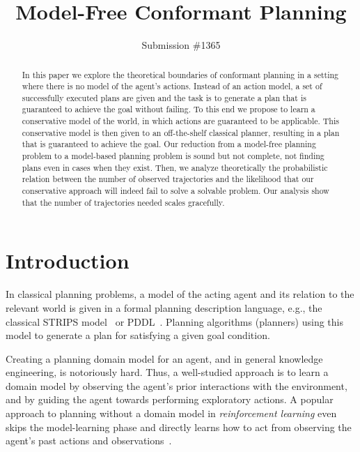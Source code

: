 \documentclass{article}
\title{Model-Free Conformant Planning}
\author{Submission \#1365}
\newcommand{\roni}[1]{[[Roni:#1]]}
\begin{document}
	
	\maketitle
	
	\begin{abstract}
		In this paper we explore the theoretical boundaries of 
		conformant planning in a setting where 
		there is no model of the agent's actions. 
		Instead of an action model, a set of successfully executed plans are given and the task is to generate a plan that is guaranteed to achieve the goal without failing. 
		To this end we propose to learn a conservative model of the world, in which actions are guaranteed to be applicable. This conservative model is then given to an off-the-shelf classical planner, resulting in a plan that is guaranteed to achieve the goal. 
		Our reduction from a model-free planning problem to a model-based planning problem is sound but not complete, not finding plans even in cases when they exist. 
		Then, we analyze theoretically the probabilistic relation between the number of observed trajectories and the likelihood that our conservative approach will indeed fail to solve a solvable problem. Our analysis show that the number of trajectories needed scales gracefully.
	\end{abstract}
	
	\section{Introduction}
	In classical planning problems, a model of the acting agent and its relation to the relevant world is given in a formal planning description language, e.g., the classical STRIPS model~\cite{fikes1971strips} or PDDL~\cite{mcdermott1998pddl}. Planning algorithms (planners) using this model to generate a plan for satisfying a given goal condition. 
	
	Creating a planning domain model for an agent, and in general knowledge engineering, is notoriously hard. %
	Thus, a well-studied approach is to learn a domain model by observing the agent's prior interactions with the environment, and by guiding the agent towards performing exploratory actions. A popular approach to planning without a domain model in {\em reinforcement learning} even skips the model-learning phase and directly learns how to act from observing the agent's past actions and observations~\cite[e.g.]{kearns2002}.  
	
\end{document}
